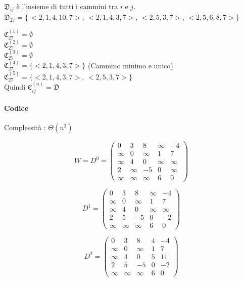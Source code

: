 \documentclass[11pt,a4paper,twoside,openright]{book}
\let\oldparagraph\paragraph
\renewcommand{\paragraph}[1]{\oldparagraph{#1}\mbox{}}
\begin{document}
{{

$\mathfrak{D}_{ij}$ è l'insieme di tutti i cammini tra $i$ e $j$. \\
$\mathfrak{D}_{27} = \{\,<2,1,4,10,7>,\,<2,1,4,3,7>,\, <2,5,3,7>,\, <2,5,6,8,7>\}$ 

$\mathfrak{C}_{27}^{(1)} = \emptyset$ \\ 
$\mathfrak{C}_{27}^{(2)} = \emptyset$ \\ 
$\mathfrak{C}_{27}^{(3)} = \emptyset$ \\ 
$\mathfrak{C}_{27}^{(4)} = \{<2,1,4,3,7>\}$ (Cammino minimo e unico)\\ 
$\mathfrak{C}_{27}^{(5)} = \{<2,1,4,3,7>,\, <2,5,3,7>\}$ \\ 
Quindi $\mathfrak{C}_{ij}^{(n)} = \mathfrak{D}$ \\ 


\paragraph{Codice}




Complessità : $\Theta(n^3)$


\[
W = D^0 = 
 \begin{pmatrix}
  0 & 3 & 8 & \infty & -4 \\ 
  \infty & 0 & \infty & 1 & 7 \\ 
  \infty & 4 & 0 & \infty & \infty \\ 
  2 & \infty & -5 & 0 & \infty \\ 
  \infty & \infty & \infty & 6 & 0
 \end{pmatrix}
\]

\[
D^1 = 
 \begin{pmatrix}
  0 & 3 & 8 & \infty & -4 \\ 
  \infty & 0 & \infty & 1 & 7 \\ 
  \infty & 4 & 0 & \infty & \infty \\ 
  2 & 5 & -5 & 0 & -2 \\ 
  \infty & \infty & \infty & 6 & 0
 \end{pmatrix}
\]

\[
D^2 = 
 \begin{pmatrix}
  0 & 3 & 8 & 4 & -4 \\ 
  \infty & 0 & \infty & 1 & 7 \\ 
  \infty & 4 & 0 & 5 & 11 \\ 
  2 & 5 & -5 & 0 & -2 \\ 
  \infty & \infty & \infty & 6 & 0
 \end{pmatrix}
\]

}}
\end{document}

